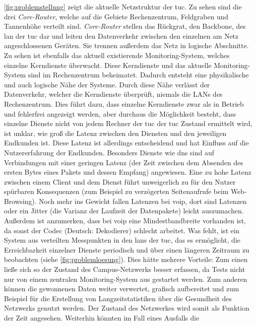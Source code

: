 \documentclass[titlepage]{report}
\begin{document}
\autoref{fig:problemstellung} zeigt die aktuelle Netzstruktur der \gls{tuc}. Zu sehen
sind die drei \emph{Core\hyp{}Router}, welche auf die Gebiete
Rechenzentrum, Feldgraben und Tannenhöhe verteilt sind.
\emph{Core\hyp{}Router} stellen das Rückgrat, den Backbone, des
\gls{lan}
der \gls{tuc} dar und leiten den Datenverkehr zwischen den einzelnen am
Netz angeschlossenen Geräten. Sie trennen außerdem das Netz in logische
Abschnitte. Zu sehen ist ebenfalls das aktuell existierende
Monitoring-System, welches einzelne Kerndienste überwacht. Diese
Kerndienste und das aktuelle Monitoring-System sind im Rechenzentrum
beheimatet. Dadurch entsteht eine physikalische und auch logische Nähe
der Systeme. Durch diese Nähe verlässt der Datenverkehr, welcher die
Kerndienste überprüft, niemals die LANs des Rechenzentrum. Dies führt dazu, dass
einzelne Kerndienste zwar als in Betrieb und fehlerfrei angezeigt
werden, aber durchaus die Möglichkeit besteht, dass einzelne Dienste
nicht von jedem Rechner der \gls{tuc} der \gls{tuc}
Zustand ermittelt wird, ist unklar, wie groß die Latenz zwischen den
Diensten und den jeweiligen Endkunden ist. Diese Latenz ist allerdings
entscheidend und hat Einfluss auf die Nutzererfahrung der Endkunden.
Besonders Dienste wie \gls{dns} sind auf Verbindungen mit einer geringen
Latenz (der Zeit zwischen dem Absenden des ersten Bytes eines Pakets und
dessen Empfang) angewiesen. Eine zu hohe Latenz zwischen einem Client und dem Dienst
führt unweigerlich zu für den Nutzer spürbaren Konsequenzen (zum
Beispiel zu verzögerten Seitenaufrufe beim Web-Browsing). Noch mehr ins
Gewicht fallen Latenzen bei \gls{voip}, dort sind Latenzen oder ein
Jitter (die Varianz der Laufzeit der Datenpakete\cite{JITTERWIKI})
leicht auszumachen. Außerdem ist anzumerken, dass bei \gls{voip} eine
Mindestbandbreite vorhanden ist, da sonst der Codec (Deutsch:
Dekodierer) schlecht arbeitet. Was fehlt, ist ein System aus verteilten
Messpunkten in den \glspl{lan} der \gls{tuc},
das es ermöglicht, die Erreichbarkeit einzelner Dienste periodisch und
über einen längeren Zeitraum zu beobachten (siehe \autoref{fig:problemloesung}). Dies
hätte mehrere Vorteile: Zum einen ließe sich so der Zustand des
Campus-Netzwerks besser erfassen, da Tests nicht nur von einem zentralen
Monitoring-System aus gestartet werden. Zum anderen können die
gewonnenen Daten weiter verwertet, grafisch aufbereitet und zum Beispiel
für die Erstellung von Langzeitstatistiken über die Gesundheit des
Netzwerks genutzt werden. Der Zustand des Netzwerkes wird somit als
Funktion der Zeit angesehen. Weiterhin könnten im Fall eines Ausfalls die
\end{document}
